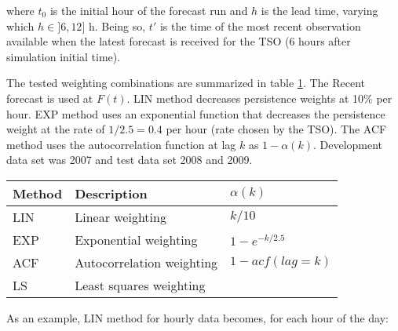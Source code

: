 where $t_0$ is the initial hour of the forecast run and $h$ is the lead time, varying which $h \in ]6,12]$ h. Being so, $t'$ is the time of the most recent observation available when the latest forecast is received for the TSO (6 hours after simulation initial time).

The tested weighting combinations are summarized in table \ref{tb:mos}. The Recent forecast is used at $F(t)$. LIN method decreases persistence weights at 10\% per hour. EXP method uses an exponential function that decreases the persistence weight at the rate of $1/2.5=0.4$ per hour (rate chosen by the TSO). The ACF method uses the autocorrelation function at lag $k$ as $1-\alpha(k)$. Development data set was 2007 and test data set 2008 and 2009.

\begin{table}[!htp]
    \small
    \centering
    \label{tb:mos}
    \begin{tabular}{lll}
        \toprule
        Method & Description & $\alpha(k)$ \\
        \midrule
        LIN & Linear weighting             & $k/10$ \\
        EXP & Exponential weighting        & $1-e^{-k/2.5}$ \\
        ACF & Autocorrelation weighting    & $1-acf(lag=k)$ \\
        LS  & Least squares weighting      & \\
        \bottomrule
    \end{tabular}
\end{table}
\FloatBarrier

As an example, LIN method for hourly data becomes, for each hour of the day:

